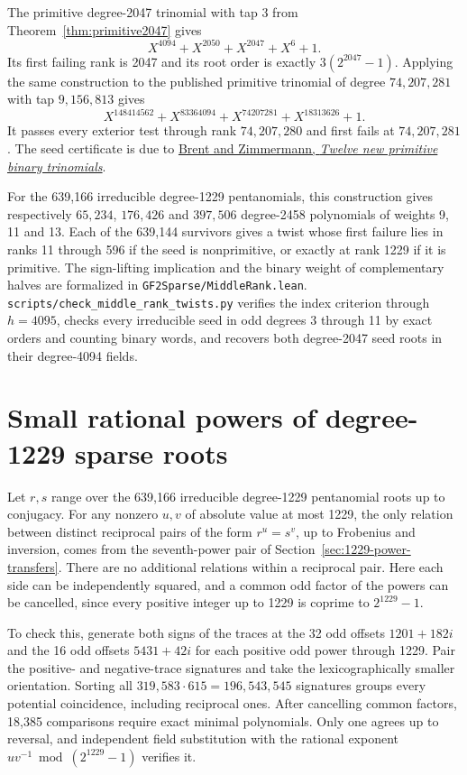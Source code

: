 \documentclass[11pt]{article}
\begin{document}
The primitive degree-2047 trinomial with tap \(3\) from
Theorem~\ref{thm:primitive2047} gives
\[
                 X^{4094}+X^{2050}+X^{2047}+X^6+1 .
\]
Its first failing rank is 2047 and its root order is exactly
\(3(2^{2047}-1)\). Applying the same construction to the published
primitive trinomial of degree \(74{,}207{,}281\) with tap
\(9{,}156{,}813\) gives
\[
       X^{148414562}+X^{83364094}+X^{74207281}+X^{18313626}+1 .
\]
It passes every exterior test through rank \(74{,}207{,}280\) and
first fails at \(74{,}207{,}281\). The seed certificate is due to
\href{https://arxiv.org/abs/1605.09213}{Brent and Zimmermann,
\emph{Twelve new primitive binary trinomials}}.

For the 639,166 irreducible degree-1229 pentanomials, this construction
gives respectively \(65{,}234\), \(176{,}426\) and \(397{,}506\)
degree-2458 polynomials of weights 9, 11 and 13. Each of the 639,144
survivors gives a twist whose first failure lies in ranks 11 through
596 if the seed is nonprimitive, or exactly at rank 1229 if it is
primitive. The sign-lifting implication and the binary weight of
complementary halves are formalized in
\nolinkurl{GF2Sparse/MiddleRank.lean}.
\nolinkurl{scripts/check_middle_rank_twists.py} verifies the index
criterion through \(h=4095\), checks every irreducible seed in odd
degrees 3 through 11 by exact orders and counting binary words,
and recovers both degree-2047 seed roots in their degree-4094 fields.

\section{Small rational powers of degree-1229 sparse roots}\label{sec:1229-sparse-ratios}
Let \(r,s\) range over the 639,166 irreducible degree-1229
pentanomial roots up to conjugacy. For any nonzero \(u,v\) of
absolute value at most 1229, the only relation between distinct
reciprocal pairs of the form \(r^u=s^v\), up to Frobenius and
inversion, comes from the seventh-power pair of
Section~\ref{sec:1229-power-transfers}. There are no additional
relations within a reciprocal pair. Here each side can be independently
squared, and a common odd factor of the powers can be cancelled, since
every positive integer up to 1229 is coprime to \(2^{1229}-1\).

To check this, generate both signs of the traces at the 32 odd offsets
\(1201+182i\) and the 16 odd offsets \(5431+42i\) for each positive
odd power through 1229. Pair the positive- and negative-trace signatures
and take the lexicographically smaller orientation. Sorting all
\(319{,}583\cdot615=196{,}543{,}545\) signatures groups every
potential coincidence, including reciprocal ones. After cancelling
common factors, 18,385 comparisons require exact minimal polynomials.
Only one agrees up to reversal, and independent field substitution
with the rational exponent \(uv^{-1}\bmod (2^{1229}-1)\) verifies it.
\end{document}
